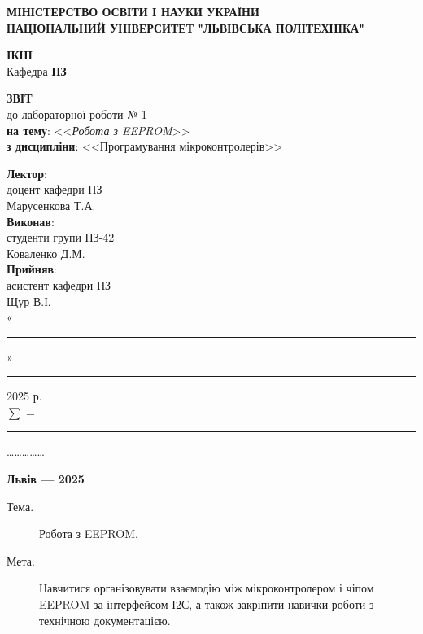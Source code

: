 \documentclass[oneside,14pt]{extarticle}
\newcommand\subject{Програмування мікроконтролерів}
\newcommand\lecturer{доцент кафедри ПЗ\\Марусенкова Т.А.}
\newcommand\teacher{асистент кафедри ПЗ\\Щур В.І.}
\newcommand\mygroup{ПЗ-42}
\newcommand\lab{1}
\newcommand\theme{Робота з EEPROM}
\newcommand\purpose{Навчитися організовувати взаємодію між мікроконтролером і чіпом EEPROM за інтерфейсом І2С, а також закріпити навички роботи з технічною
документацією}
\begin{document}
\begin{normalsize}
	\begin{titlepage}
		\thispagestyle{empty}
		\begin{center}
			\textbf{МІНІСТЕРСТВО ОСВІТИ І НАУКИ УКРАЇНИ\\
				НАЦІОНАЛЬНИЙ УНІВЕРСИТЕТ "ЛЬВІВСЬКА ПОЛІТЕХНІКА"}
		\end{center}
		\begin{flushright}
			\textbf{ІКНІ}\\
			Кафедра \textbf{ПЗ}
		\end{flushright}
		\vspace{80pt}
		\begin{center}
			\textbf{ЗВІТ}\\
			\vspace{10pt}
			до лабораторної роботи № \lab\\
			\textbf{на тему}: <<\textit{\theme}>>\\
			\textbf{з дисципліни}: <<\subject>>
		\end{center}
		\vspace{80pt}
		\begin{flushright}
			
			\textbf{Лектор}:\\
			\lecturer\\
			\vspace{28pt}
			\textbf{Виконав}:\\
			
			студенти групи \mygroup\\
			Коваленко Д.М.\\
			\vspace{28pt}
			\textbf{Прийняв}:\\
			
			\teacher\\
			
			\vspace{28pt}
			«\rule{1cm}{0.15mm}» \rule{1.5cm}{0.15mm} 2025 р.\\
			$\sum$ = \rule{1cm}{0.15mm}……………\\
			
		\end{flushright}
		\vspace{\fill}
		\begin{center}
			\textbf{Львів — 2025}
		\end{center}
	\end{titlepage}
		
	\begin{description}
		\item[Тема.] \theme.
		\item[Мета.] \purpose.
	\end{description}


\end{normalsize}
\end{document}

